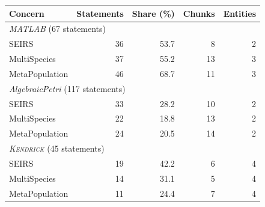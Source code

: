 \setlength{\tabcolsep}{3pt}
\begin{tabular}{|l|r|r|r|r|}
\hline
Concern & Statements & Share (\%) & Chunks & Entities \\
\hline
\multicolumn{5}{|l|}{\emph{MATLAB} (67 statements)} \\
\hline
SEIRS & 36 & 53.7 & 8 & 2 \\
MultiSpecies & 37 & 55.2 & 13 & 3 \\
MetaPopulation & 46 & 68.7 & 11 & 3 \\
\hline
\multicolumn{5}{|l|}{\emph{AlgebraicPetri} (117 statements)} \\
\hline
SEIRS & 33 & 28.2 & 10 & 2 \\
MultiSpecies & 22 & 18.8 & 13 & 2 \\
MetaPopulation & 24 & 20.5 & 14 & 2 \\
\hline
\multicolumn{5}{|l|}{\emph{\textsc{Kendrick}} (45 statements)} \\
\hline
SEIRS & 19 & 42.2 & 6 & 4 \\
MultiSpecies & 14 & 31.1 & 5 & 4 \\
MetaPopulation & 11 & 24.4 & 7 & 4 \\
\hline
\end{tabular}
